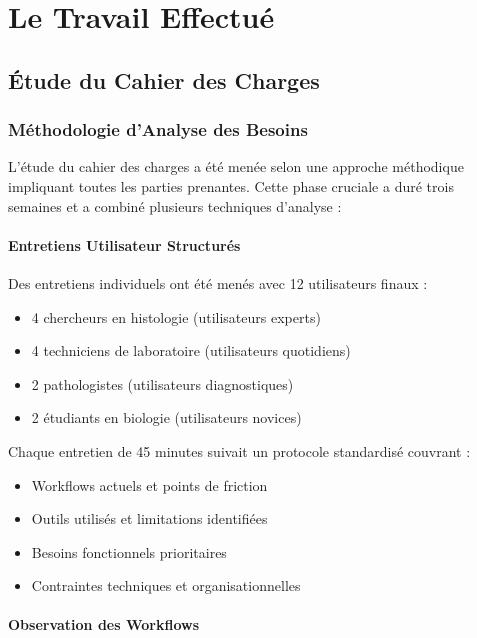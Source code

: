 \documentclass[12pt,a4paper]{report}
\begin{document}
\chapter{Le Travail Effectué}

\section{Étude du Cahier des Charges}

\subsection{Méthodologie d'Analyse des Besoins}

L'étude du cahier des charges a été menée selon une approche méthodique impliquant toutes les parties prenantes. Cette phase cruciale a duré trois semaines et a combiné plusieurs techniques d'analyse :

\subsubsection{Entretiens Utilisateur Structurés}

Des entretiens individuels ont été menés avec 12 utilisateurs finaux :
\begin{itemize}
\item 4 chercheurs en histologie (utilisateurs experts)
\item 4 techniciens de laboratoire (utilisateurs quotidiens)
\item 2 pathologistes (utilisateurs diagnostiques)
\item 2 étudiants en biologie (utilisateurs novices)
\end{itemize}

Chaque entretien de 45 minutes suivait un protocole standardisé couvrant :
\begin{itemize}
\item Workflows actuels et points de friction
\item Outils utilisés et limitations identifiées
\item Besoins fonctionnels prioritaires
\item Contraintes techniques et organisationnelles
\end{itemize}

\subsubsection{Observation des Workflows}
\end{document}
